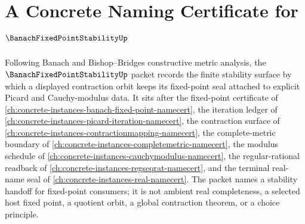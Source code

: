 \chapter{A Concrete Naming Certificate for $\BanachFixedPointStabilityUp$}
\label{ch:concrete-instances-banach-fixed-point-stability-namecert}

Following Banach and Bishop--Bridges constructive metric analysis, the $\BanachFixedPointStabilityUp$ packet records the finite stability surface by which a displayed contraction orbit keeps its fixed-point seal attached to explicit Picard and Cauchy-modulus data. It sits after the fixed-point certificate of \autoref{ch:concrete-instances-banach-fixed-point-namecert}, the iteration ledger of \autoref{ch:concrete-instances-picard-iteration-namecert}, the contraction surface of \autoref{ch:concrete-instances-contractionmapping-namecert}, the complete-metric boundary of \autoref{ch:concrete-instances-completemetric-namecert}, the modulus schedule of \autoref{ch:concrete-instances-cauchymodulus-namecert}, the regular-rational readback of \autoref{ch:concrete-instances-regseqrat-namecert}, and the terminal real-name seal of \autoref{ch:concrete-instances-real-namecert}. The packet names a stability handoff for fixed-point consumers; it is not ambient real completeness, a selected host fixed point, a quotient orbit, a global contraction theorem, or a choice principle.

